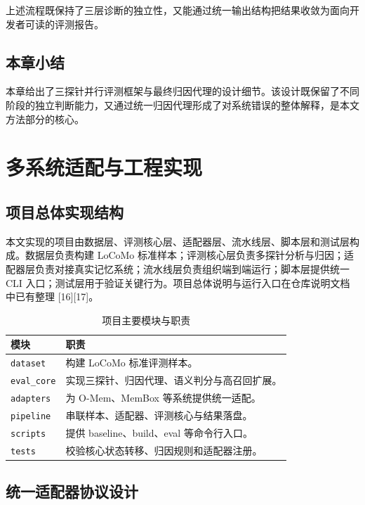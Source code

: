 上述流程既保持了三层诊断的独立性，又能通过统一输出结构把结果收敛为面向开发者可读的评测报告。

\section{本章小结}

本章给出了三探针并行评测框架与最终归因代理的设计细节。该设计既保留了不同阶段的独立判断能力，又通过统一归因代理形成了对系统错误的整体解释，是本文方法部分的核心。

\chapter{多系统适配与工程实现}

\section{项目总体实现结构}

本文实现的项目由数据层、评测核心层、适配器层、流水线层、脚本层和测试层构成。数据层负责构建 LoCoMo 标准样本；评测核心层负责多探针分析与归因；适配器层负责对接真实记忆系统；流水线层负责组织端到端运行；脚本层提供统一 CLI 入口；测试层用于验证关键行为。项目总体说明与运行入口在仓库说明文档中已有整理 [16][17]。

\begin{table}[htbp]
\centering
\caption{项目主要模块与职责}
\label{tab:modules}
\begin{tabular}{p{}p{}}
\toprule
模块 & 职责 \\
\midrule
\texttt{dataset} & 构建 LoCoMo 标准评测样本。 \\
\texttt{eval\_core} & 实现三探针、归因代理、语义判分与高召回扩展。 \\
\texttt{adapters} & 为 O-Mem、MemBox 等系统提供统一适配。 \\
\texttt{pipeline} & 串联样本、适配器、评测核心与结果落盘。 \\
\texttt{scripts} & 提供 baseline、build、eval 等命令行入口。 \\
\texttt{tests} & 校验核心状态转移、归因规则和适配器注册。 \\
\bottomrule
\end{tabular}
\end{table}

\section{统一适配器协议设计}

